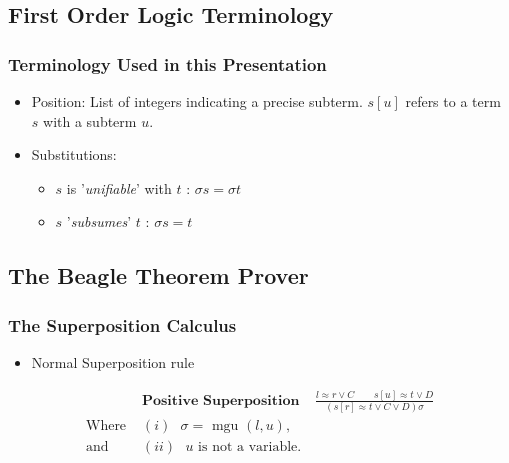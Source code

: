 \documentclass[10pt,xcolor={dvipsnames}]{beamer}
\begin{document}
\begin{NoHyper}
\subsection{First Order Logic Terminology}

\begin{frame}
  \frametitle{Terminology Used in this Presentation}
  \begin{itemize}
  \item<1-> Position: List of integers indicating a precise subterm. $s[u]$ refers
  to a term $s$ with a subterm $u$.
  \item<2-> Substitutions:
    \begin{itemize}
    \item<3-> $s$ is '\emph{unifiable}' with $t$ : $\sigma s = \sigma t$
    \item<3-> $s$ '\emph{subsumes}' $t$ : $\sigma s = t$
    \end{itemize}
  \end{itemize}
\end{frame}

\subsection{The Beagle Theorem Prover}

\begin{frame}
  \frametitle{The Superposition Calculus}
  \begin{itemize}
  \item<1-> Normal Superposition rule
  \end{itemize}
  \begin{align*}
&\textbf{Positive Superposition}\ \ \ \ \  \frac{l \approx r \lor C\quad \quad s[u] \approx t \lor D}{(s[r] \approx t \lor C \lor D)\sigma}\\
\text{Where } &(i) \text{ $\sigma = $ mgu $(l,u)$,}\\
\text{and } &(ii) \text{ $u$ is not a variable.}
\end{align*}
\end{frame}


\end{NoHyper}
\end{document}
